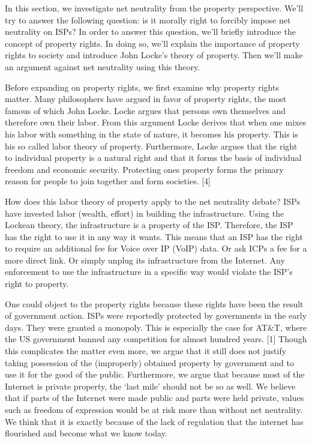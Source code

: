 
In this section, we investigate net neutrality from the property perspective. We'll try to answer the following question: is it morally right to forcibly impose net neutrality on ISPs? In order to answer this question, we'll briefly introduce the concept of property rights. In doing so, we'll explain the importance of property rights to society and introduce John Locke's theory of property. Then we'll make an argument against net neutrality using this theory.

Before expanding on property rights, we first examine why property rights matter. Many philosophers have argued in favor of property rights, the most famous of which John Locke. Locke argues that persons own themselves and therefore own their labor. From this argument Locke derives that when one mixes his labor with something in the state of nature, it becomes his property. This is his so called labor theory of property. Furthermore, Locke argues that the right to individual property is a natural right and that it forms the basis of individual freedom and economic security. Protecting ones property forms the primary reason for people to join together and form societies. [4]

How does this labor theory of property apply to the net neutrality debate? ISPs have invested labor (wealth, effort) in building the infrastructure. Using the Lockean theory, the infrastructure is a property of the ISP. Therefore, the ISP has the right to use it in any way it wants. This means that an ISP has the right to require an additional fee for Voice over IP (VoIP) data. Or ask ICPs a fee for a more direct link. Or simply unplug its infrastructure from the Internet. Any enforcement to use the infrastructure in a specific way would violate the ISP's right to property.

One could object to the property rights because these rights have been the result of government action. ISPs were reportedly protected by governments in the early days. They were granted a monopoly. This is especially the case for AT\&T, where the US government banned any competition for almost hundred years. [1] Though this complicates the matter even more, we argue that it still does not justify taking possession of the (improperly) obtained property by government and to use it for the good of the public. Furthermore, we argue that because most of the Internet is private property, the `last mile' should not be so as well. We believe that if parts of the Internet were made public and parts were held private, values such as freedom of expression would be at risk more than without net neutrality. We think that it is exactly because of the lack of regulation that the internet has flourished and become what we know today.

